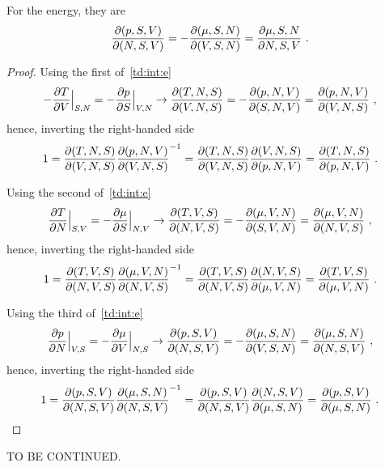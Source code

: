     For the energy, they are
    \begin{equation*}
        \frac{\partial(p, S, V )}{\partial(N, S, V)} = - \frac{\partial(\mu, S, N)}{\partial(V, S, N)} = \frac{\partial\mu, S, N}{\partial N, S, V} ~.
    \end{equation*}
    \begin{proof}
        Using the first of~\eqref{td:int:e}
        \begin{equation*}
            - \frac{\partial T}{\partial V} \Big \vert_{S, N} = - \frac{\partial p}{\partial S} \Big \vert_{V, N} \rightarrow \frac{\partial(T, N, S)}{\partial(V, N, S)} = - \frac{\partial(p, N, V)}{\partial(S, N, V)} = \frac{\partial(p, N, V)}{\partial(V, N, S)} ~,
        \end{equation*} 
        hence, inverting the right-handed side
        \begin{equation*}
            1 = \frac{\partial(T, N, S)}{\partial(V, N, S)} \frac{\partial(p, N, V)}{\partial(V, N, S)}^{-1} = \frac{\partial(T, N, S)}{\partial(V, N, S)} \frac{\partial(V, N, S)}{\partial(p, N, V)} = \frac{\partial(T, N, S)}{\partial(p, N, V)} ~.
        \end{equation*} 

        Using the second of~\eqref{td:int:e}
        \begin{equation*}
            \frac{\partial T}{\partial N} \Big \vert_{S, V} = - \frac{\partial\mu}{\partial S} \Big \vert_{N, V} \rightarrow \frac{\partial(T, V, S)}{\partial(N, V, S)} = - \frac{\partial(\mu, V, N)}{\partial(S, V, N)} = \frac{\partial(\mu, V, N)}{\partial(N, V, S)} ~,
        \end{equation*} 
        hence, inverting the right-handed side
        \begin{equation*}
            1 = \frac{\partial(T, V, S)}{\partial(N, V, S)} \frac{\partial(\mu, V, N)}{\partial(N, V, S)}^{-1} = \frac{\partial(T, V, S)}{\partial(N, V, S)} \frac{\partial(N, V, S)}{\partial(\mu, V, N)} = \frac{\partial(T, V, S)}{\partial(\mu, V, N)} ~.
        \end{equation*} 

        Using the third of~\eqref{td:int:e}
        \begin{equation*}
            \frac{\partial p}{\partial N} \Big \vert_{V, S} = - \frac{\partial\mu}{\partial V} \Big \vert_{N, S} \rightarrow \frac{\partial(p, S, V )}{\partial(N, S, V)} = - \frac{\partial(\mu, S, N)}{\partial(V, S, N)} = \frac{\partial(\mu, S, N)}{\partial(N, S, V)} ~,
        \end{equation*} 
        hence, inverting the right-handed side
        \begin{equation*}
            1 = \frac{\partial(p, S, V )}{\partial(N, S, V)} \frac{\partial(\mu, S, N)}{\partial(N, S, V)}^{-1} = \frac{\partial(p, S, V )}{\partial(N, S, V)} \frac{\partial(N, S, V)}{\partial(\mu, S, N)} = \frac{\partial(p, S, V )}{\partial(\mu, S, N)} ~.
        \end{equation*} 
    \end{proof}

    TO BE CONTINUED.


